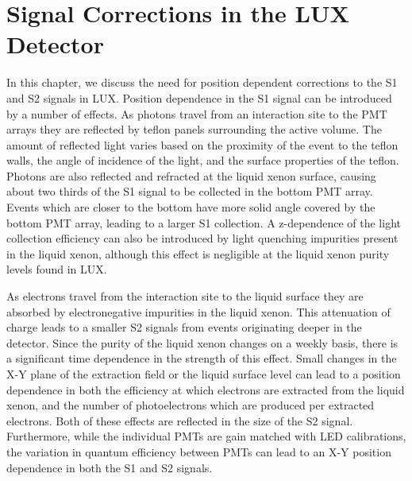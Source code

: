 
\section{Signal Corrections in the LUX Detector} \label{StandardCalibrations}

In this chapter, we discuss the need for position dependent corrections to the S1 and S2 signals in LUX.  Position dependence in the S1 signal can be introduced by a number of effects.  As photons travel from an interaction site to the PMT arrays they are reflected by teflon panels surrounding the active volume.  The amount of reflected light varies based on the proximity of the event to the teflon walls, the angle of incidence of the light, and the surface properties of the teflon.   Photons are also reflected and refracted at the liquid xenon surface, causing about two thirds of the S1 signal to be collected in the bottom PMT array.  Events which are closer to the bottom have more solid angle covered by the bottom PMT array, leading to a larger S1 collection.  A z-dependence of the light collection efficiency can also be introduced by light quenching impurities present in the liquid xenon, although this effect is negligible at the liquid xenon purity levels found in LUX.

As electrons travel from the interaction site to the liquid surface they are absorbed by electronegative impurities in the liquid xenon.  This attenuation of charge leads to a smaller S2 signals from events originating deeper in the detector.  Since the purity of the liquid xenon changes on a weekly basis, there is a significant time dependence in the strength of this effect. Small changes in the X-Y plane of the extraction field or the liquid surface level can lead to a position dependence in both the efficiency at which electrons are extracted from the liquid xenon, and the number of photoelectrons which are produced per extracted electrons.  Both of these effects are reflected in the size of the S2 signal.  Furthermore, while the individual PMTs are gain matched with LED calibrations, the variation in quantum efficiency between PMTs can lead to an X-Y position dependence in both the S1 and S2 signals.

